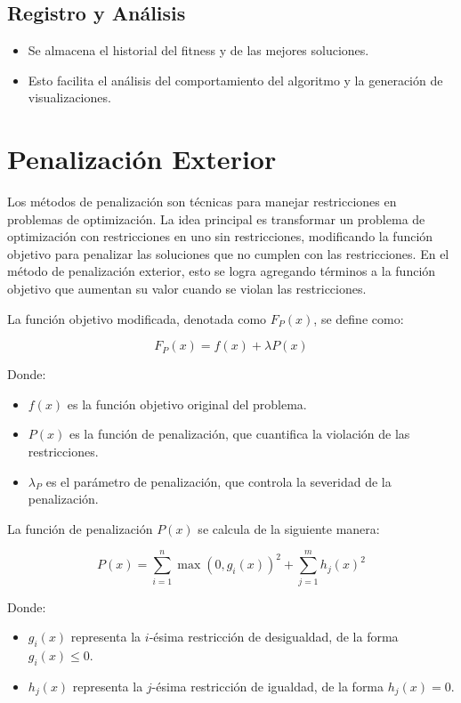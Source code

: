 \subsection*{Registro y An\'alisis}
\begin{itemize}
    \item Se almacena el historial del fitness y de las mejores soluciones.
    \item Esto facilita el an\'alisis del comportamiento del algoritmo y la generaci\'on de visualizaciones.
\end{itemize}

\section{Penalización Exterior}

Los métodos de penalización son técnicas para manejar restricciones en problemas de optimización. La idea principal es transformar un problema de optimización con restricciones en uno sin restricciones, modificando la función objetivo para penalizar las soluciones que no cumplen con las restricciones. En el método de penalización exterior, esto se logra agregando términos a la función objetivo que aumentan su valor cuando se violan las restricciones.

La función objetivo modificada, denotada como \( F_P(x) \), se define como:

\[
F_P(x) = f(x) + \lambda P(x)
\]

Donde:

\begin{itemize}
    \item \( f(x) \) es la función objetivo original del problema.
    \item \( P(x) \) es la función de penalización, que cuantifica la violación de las restricciones.
    \item \( \lambda_P \) es el parámetro de penalización, que controla la severidad de la penalización.
\end{itemize}

La función de penalización \( P(x) \) se calcula de la siguiente manera:

\[
P(x) = \sum_{i=1}^{n} \max(0, g_i(x))^2 + \sum_{j=1}^{m} h_j(x)^2
\]

Donde:

\begin{itemize}
    \item \( g_i(x) \) representa la \( i \)-ésima restricción de desigualdad, de la forma \( g_i(x) \leq 0 \).
    \item \( h_j(x) \) representa la \( j \)-ésima restricción de igualdad, de la forma \( h_j(x) = 0 \).
\end{itemize}

